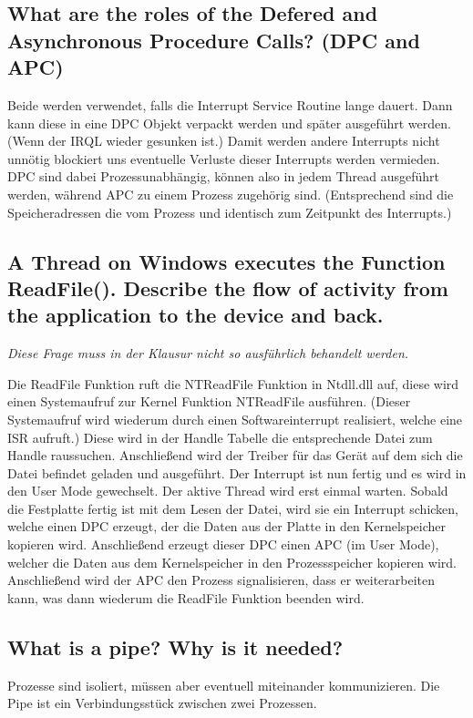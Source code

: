 \subsection{What are the roles of the Defered and Asynchronous Procedure Calls? (DPC and APC)}
Beide werden verwendet, falls die Interrupt Service Routine lange dauert.
Dann kann diese in eine DPC Objekt verpackt werden und später ausgeführt werden.
(Wenn der IRQL wieder gesunken ist.)
Damit werden andere Interrupts nicht unnötig blockiert uns eventuelle Verluste dieser Interrupts werden vermieden.\\
DPC sind dabei Prozessunabhängig, können also in jedem Thread ausgeführt werden, während APC zu einem Prozess zugehörig sind.
(Entsprechend sind die Speicheradressen die vom Prozess und identisch zum Zeitpunkt des Interrupts.)

\subsection{A Thread on Windows executes the Function ReadFile(). Describe the flow of activity from the application to the device and back.}
\textit{Diese Frage muss in der Klausur nicht so ausführlich behandelt werden.}

Die ReadFile Funktion ruft die NTReadFile Funktion in Ntdll.dll auf, diese wird einen Systemaufruf zur Kernel Funktion NTReadFile ausführen.
(Dieser Systemaufruf wird wiederum durch einen Softwareinterrupt realisiert, welche eine ISR aufruft.)
Diese wird in der Handle Tabelle die entsprechende Datei zum Handle raussuchen.
Anschließend wird der Treiber für das Gerät auf dem sich die Datei befindet geladen und ausgeführt.
Der Interrupt ist nun fertig und es wird in den User Mode gewechselt.
Der aktive Thread wird erst einmal warten.
Sobald die Festplatte fertig ist mit dem Lesen der Datei, wird sie ein Interrupt schicken, welche einen DPC erzeugt, der die Daten aus der Platte in den Kernelspeicher kopieren wird.
Anschließend erzeugt dieser DPC einen APC (im User Mode), welcher die Daten aus dem Kernelspeicher in den Prozessspeicher kopieren wird.
Anschließend wird der APC den Prozess signalisieren, dass er weiterarbeiten kann, was dann wiederum die ReadFile Funktion beenden wird.

\subsection{What is a pipe? Why is it needed?}
Prozesse sind isoliert, müssen aber eventuell miteinander kommunizieren.
Die Pipe ist ein Verbindungsstück zwischen zwei Prozessen.

